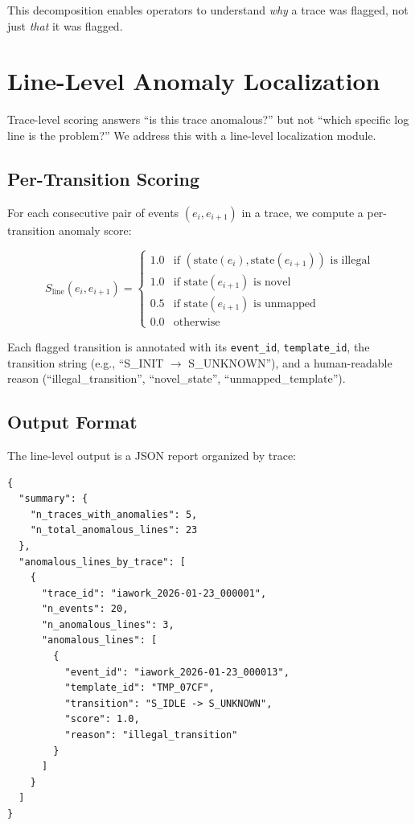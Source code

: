 \documentclass[11pt]{article}
\begin{document}
This decomposition enables operators to understand \emph{why} a trace was flagged, not just \emph{that} it was flagged.

\section{Line-Level Anomaly Localization}
\label{sec:line}

Trace-level scoring answers ``is this trace anomalous?'' but not ``which specific log line is the problem?'' We address this with a line-level localization module.

\subsection{Per-Transition Scoring}

For each consecutive pair of events $(e_i, e_{i+1})$ in a trace, we compute a per-transition anomaly score:

\begin{equation}
    S_{\text{line}}(e_i, e_{i+1}) = 
    \begin{cases}
        1.0 & \text{if } (\text{state}(e_i), \text{state}(e_{i+1})) \text{ is illegal} \\
        1.0 & \text{if } \text{state}(e_{i+1}) \text{ is novel} \\
        0.5 & \text{if } \text{state}(e_{i+1}) \text{ is unmapped} \\
        0.0 & \text{otherwise}
    \end{cases}
\end{equation}

Each flagged transition is annotated with its \texttt{event\_id}, \texttt{template\_id}, the transition string (e.g., ``S\_INIT $\rightarrow$ S\_UNKNOWN''), and a human-readable reason (``illegal\_transition'', ``novel\_state'', ``unmapped\_template'').

\subsection{Output Format}

The line-level output is a JSON report organized by trace:

\begin{verbatim}
{
  "summary": {
    "n_traces_with_anomalies": 5,
    "n_total_anomalous_lines": 23
  },
  "anomalous_lines_by_trace": [
    {
      "trace_id": "iawork_2026-01-23_000001",
      "n_events": 20,
      "n_anomalous_lines": 3,
      "anomalous_lines": [
        {
          "event_id": "iawork_2026-01-23_000013",
          "template_id": "TMP_07CF",
          "transition": "S_IDLE -> S_UNKNOWN",
          "score": 1.0,
          "reason": "illegal_transition"
        }
      ]
    }
  ]
}
\end{verbatim}
\end{document}
